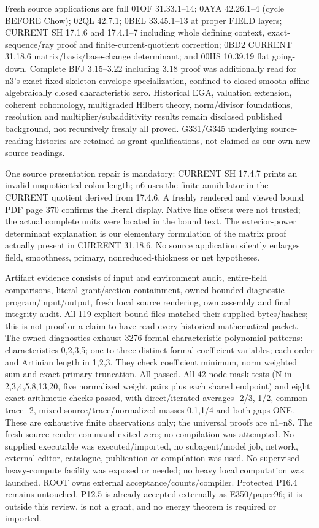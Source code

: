 \documentclass[11pt]{article}
\begin{document}
\begin{ReviewBody}
Fresh source applications are full 01OF 31.33.1--14; 0AYA 42.26.1--4 (cycle BEFORE Chow); 02QL 42.7.1; 0BEL 33.45.1--13 at proper FIELD layers; CURRENT SH 17.1.6 and 17.4.1--7 including whole defining context, exact-sequence/ray proof and finite-current-quotient correction; 0BD2 CURRENT 31.18.6 matrix/basis/base-change determinant; and 00HS 10.39.19 flat going-down. Complete BFJ 3.15--3.22 including 3.18 proof was additionally read for n3's exact fixed-skeleton envelope specialization, confined to closed smooth affine algebraically closed characteristic zero. Historical EGA, valuation extension, coherent cohomology, multigraded Hilbert theory, norm/divisor foundations, resolution and multiplier/subadditivity results remain disclosed published background, not recursively freshly all proved. G331/G345 underlying source-reading histories are retained as grant qualifications, not claimed as our own new source readings.

One source presentation repair is mandatory: CURRENT SH 17.4.7 prints an invalid unquotiented colon length; n6 uses the finite annihilator in the CURRENT quotient derived from 17.4.6. A freshly rendered and viewed bound PDF page 370 confirms the literal display. Native line offsets were not trusted; the actual complete units were located in the bound text. The exterior-power determinant explanation is our elementary formulation of the matrix proof actually present in CURRENT 31.18.6. No source application silently enlarges field, smoothness, primary, nonreduced-thickness or net hypotheses.

Artifact evidence consists of input and environment audit, entire-field comparisons, literal grant/section containment, owned bounded diagnostic program/input/output, fresh local source rendering, own assembly and final integrity audit. All 119 explicit bound files matched their supplied bytes/hashes; this is not proof or a claim to have read every historical mathematical packet. The owned diagnostics exhaust 3276 formal characteristic-polynomial patterns: characteristics 0,2,3,5; one to three distinct formal coefficient variables; each order and Artinian length in {1,2,3}. They check coefficient minimum, norm weighted sum and exact primary truncation. All passed. All 42 node-mask tests (N in {2,3,4,5,8,13,20}, five normalized weight pairs plus each shared endpoint) and eight exact arithmetic checks passed, with direct/iterated averages -2/3,-1/2, common trace -2, mixed-source/trace/normalized masses 0,1,1/4 and both gaps ONE. These are exhaustive finite observations only; the universal proofs are n1--n8. The fresh source-render command exited zero; no compilation was attempted. No supplied executable was executed/imported, no subagent/model job, network, external editor, catalogue, publication or compilation was used. No supervised heavy-compute facility was exposed or needed; no heavy local computation was launched. ROOT owns external acceptance/counts/compiler. Protected P16.4 remains untouched. P12.5 is already accepted externally as E350/paper96; it is outside this review, is not a grant, and no energy theorem is required or imported.


\end{ReviewBody}
\end{document}
